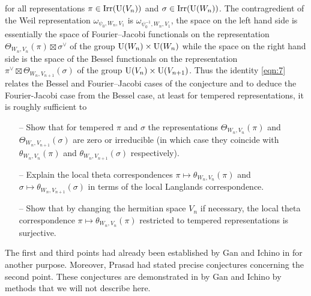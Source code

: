 for all representations $\pi \in \mathrm{Irr}(\mathrm{U}(V_n))$ and $\sigma \in \mathrm{Irr}(\mathrm{U}(W_n))$.
The contragredient of the Weil representation $\omega_{\psi_0, W_n, V_1}$ is $\omega_{\psi_0^{-1}, W_n, V_1}$, the space on the left hand side is essentially the space of Fourier--Jacobi functionals on the representation $\Theta_{W_n, V_n}(\pi) \boxtimes \sigma^\vee$ of the group $\mathrm{U}(W_n) \times \mathrm{U}(W_n)$ while the space on the right hand side is the space of the Bessel functionals on the representation $\pi^\vee \boxtimes \Theta_{W_n, V_{n+1}}(\sigma)$ of the group $\mathrm{U}(V_n) \times \mathrm{U}(V_{n+1})$.
Thus the identity \eqref{eqn:7} relates the Bessel and Fourier--Jacobi cases of the conjecture and to deduce the Fourier-Jacobi case from the Bessel case, at least for tempered representations, it is roughly sufficient to
\begin{itemize}
    \item[--] Show that for tempered $\pi$ and $\sigma$ the representations $\Theta_{W_n, V_n}(\pi)$ and $\Theta_{W_n, V_{n+1}}(\sigma)$ are zero or irreducible (in which case they coincide with $\theta_{W_n, V_n}(\pi)$ and $\theta_{W_n, V_{n+1}}(\sigma)$ respectively).
    \item[--] Explain the local theta correspondences $\pi \mapsto \theta_{W_n, V_n}(\pi)$ and $\sigma\mapsto \theta_{W_n, V_{n+1}}(\sigma)$ in terms of the local Langlands correspondence.
    \item[--] Show that by changing the hermitian space $V_n$ if necessary, the local theta correspondence $\pi \mapsto \theta_{W_n, V_n}(\pi)$ restricted to tempered representations is surjective.
\end{itemize}
The first and third points had already been established by Gan and Ichino in \cite{gan2014formal} for another purpose.
Moreover, Prasad \cite{prasad1993local,prasad2000theta} had stated precise conjectures concerning the second point.
These conjectures are demonstrated in \cite{gan2016gross} by Gan and Ichino by methods that we will not describe here.
